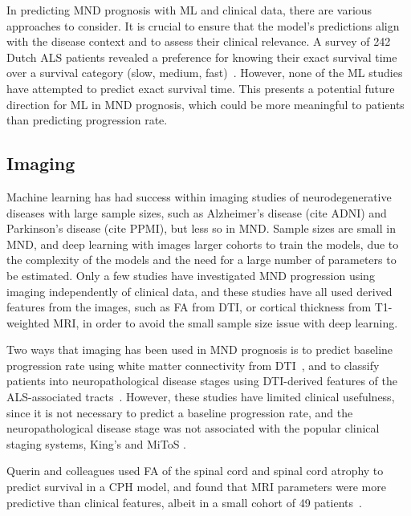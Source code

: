 In predicting MND prognosis with ML and clinical data, there are various approaches to consider.
It is crucial to ensure that the model's predictions align with the disease context and to assess their clinical relevance.
A survey of 242 Dutch ALS patients revealed a preference for knowing their exact survival time over a survival category (slow, medium, fast)~\cite{westenengPrognosisPatientsAmyotrophic2018}.
However, none of the ML studies have attempted to predict exact survival time.
This presents a potential future direction for ML in MND prognosis, which could be more meaningful to patients than predicting progression rate.

\subsection{Imaging}

Machine learning has had success within imaging studies of neurodegenerative diseases with large sample sizes, such as Alzheimer's disease (cite ADNI) and Parkinson's disease (cite PPMI), but less so in MND.
Sample sizes are small in MND, and deep learning with images larger cohorts to train the models, due to the complexity of the models and the need for a large number of parameters to be estimated.
Only a few studies have investigated MND progression using imaging independently of clinical data, and these studies have all used derived features from the images, such as FA from DTI, or cortical thickness from T1-weighted MRI, in order to avoid the small sample size issue with deep learning.

Two ways that imaging has been used in MND prognosis is to predict baseline progression rate using white matter connectivity from DTI~\cite{liDisruptionWhiteMatter2021}, and to classify patients into neuropathological disease stages using DTI-derived features of the ALS-associated tracts~\cite{behlerMultivariateBayesianClassification2022}.
However, these studies have limited clinical usefulness, since it is not necessary to predict a baseline progression rate, and the neuropathological disease stage was not associated with the popular clinical staging systems, King's and MiToS .

Querin and colleagues used FA of the spinal cord and spinal cord atrophy to predict survival in a CPH model, and found that MRI parameters were more predictive than clinical features, albeit in a small cohort of 49 patients~\cite{querinSpinalCordMultiparametric2017}.

